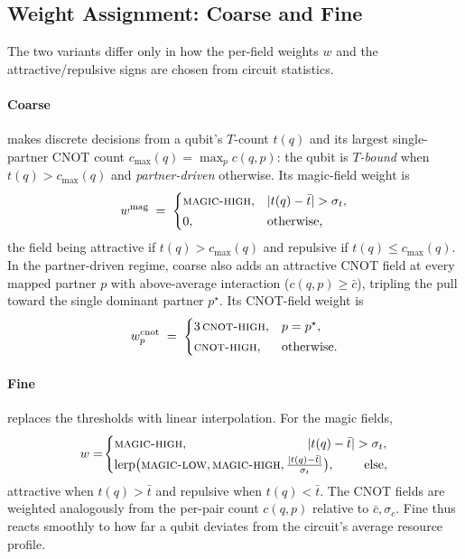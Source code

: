 \documentclass[10pt,conference]{IEEEtran}
\theoremstyle{definition}
\theoremstyle{remark}
\begin{document}
\subsection{Weight Assignment: Coarse and Fine}

The two variants differ only in how the per-field weights $w$ and the
attractive/repulsive signs are chosen from circuit statistics.

\paragraph{Coarse} makes discrete decisions from a qubit's $T$-count $t(q)$ and
its largest single-partner CNOT count $c_{\max}(q)=\max_{p}c(q,p)$: the qubit is
\emph{$T$-bound} when $t(q)>c_{\max}(q)$ and \emph{partner-driven} otherwise. Its
magic-field weight is
\begin{equation*}
w^{\mathrm{mag}} \;=\;
\begin{cases}
\textsc{magic-high}, & |t(q)-\bar t|>\sigma_t,\\[2pt]
0, & \text{otherwise,}
\end{cases}
\end{equation*}
the field being attractive if $t(q) > c_{\max}(q)$ and repulsive if $t(q)\le c_{\max}(q)$.
In the partner-driven regime, coarse also adds an attractive CNOT field at every mapped
partner $p$ with above-average interaction ($c(q,p)\ge \bar c$), tripling the
pull toward the single dominant partner $p^{\star}$. 
Its CNOT-field weight is
\begin{equation*}
w^{\mathrm{cnot}}_{p} \;=\;
\begin{cases}
3\,\textsc{cnot-high}, & p=p^{\star},\\[2pt]
\textsc{cnot-high}, & \text{otherwise.}
\end{cases}
\end{equation*}

\paragraph{Fine} replaces the thresholds with linear interpolation. For the magic
fields,
\begin{equation*}
w =\!
\begin{cases}
\textsc{magic-high}, & \hspace{-30pt} |t(q)-\bar t|>\sigma_t,\\[2pt]
\mathrm{lerp}\big(\textsc{magic-low},\textsc{magic-high},\tfrac{|t(q)-\bar t|}{\sigma_t}\big), & \hspace{15pt} \text{else},
\end{cases}
\end{equation*}
attractive when $t(q)>\bar t$ and repulsive when $t(q)<\bar t$. The CNOT fields are weighted analogously from the per-pair count
$c(q,p)$ relative to $\bar c,\sigma_c$. Fine thus reacts smoothly to how far a
qubit deviates from the circuit's average resource profile.
\end{document}

